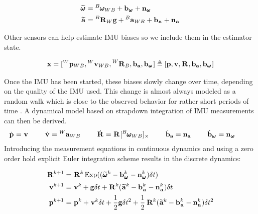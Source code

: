 \begin{equation}
    \begin{split}
    \prescript{}{}{\widetilde{\pmb{\omega}}}_{} &= \prescript{B}{}{\pmb{\omega}}_{WB} + {\bf b}_{\prescript{}{}{\pmb{\omega}}_{}} + {\bf n}_{\prescript{}{}{\pmb{\omega}}_{}} 
    \\
    \prescript{}{}{\widetilde{{\bf a}}}_{}    &= \prescript{B}{}{{\bf R}}_{W} {\bf g} + \prescript{B}{}{{\bf a}}_{WB} + {\bf b}_{\prescript{}{}{{\bf a}}_{}} + {\bf n}_{\prescript{}{}{{\bf a}}_{}} 
    \end{split}
    \label{eq:imu_meas_model}
\end{equation}
    
Other sensors can help estimate IMU biases so we include them in the estimator state.

\begin{equation}
    {\bf x} = [\prescript{W}{}{{\bf p}}_{WB}, \prescript{W}{}{{\bf v}}_{WB}, \prescript{W}{}{{\bf R}}_{B}, {\bf b}_{{\bf a}}, {\bf b}_{\prescript{}{}{\pmb{\omega}}_{}}]
    \triangleq 
    [{\bf p}, {\bf v}, \prescript{}{}{{\bf R}}_{}, {\bf b}_{{\bf a}}, {\bf b}_{\prescript{}{}{\pmb{\omega}}_{}}] 
\end{equation}

Once the IMU has been started, these biases slowly change over time, depending on the quality of the IMU used. This change is almost always modeled 
as a random walk which is close to the observed behavior for rather short periods of time \cite{hussen2015low}.
A dynamical model based on strapdown integration of IMU measurements can then be derived.
%
\begin{equation}
    \begin{split}
    \dot{\prescript{}{}{{\bf p}}_{}} = \prescript{}{}{{\bf v}}_{}  ~~~~~~~
    \dot{\prescript{}{}{{\bf v}}_{}} = \prescript{W}{}{{\bf a}}_{WB} ~~~~~~~
    \dot{\prescript{}{}{{\bf R}}_{}} = \prescript{}{}{{\bf R}}_{} [\prescript{B}{}{\pmb{\omega}}_{WB}]_{\times} ~~~~~~~
    \dot{{\bf b}}_{{\bf a}} = {\bf n}_{{\bf a}}  ~~~~~~~
    \dot{{\bf b}}_{\prescript{}{}{\pmb{\omega}}_{}} = {\bf n}_{\prescript{}{}{\pmb{\omega}}_{}} ~~~~~~~
    \end{split}
    \label{eq:imu_dyn_conti}
\end{equation}
%
Introducing the measurement equations  in continuous dynamics  and using a zero order hold
explicit Euler integration scheme results in the discrete dynamics:

\begin{equation}
    \begin{split}
    \prescript{}{}{{\bf R}}_{}^{k+1}  &= \prescript{}{}{{\bf R}}_{}^{k}\operatorname*{Exp}((\prescript{}{}{\widetilde{\pmb{\omega}}}_{}^k - {\bf b}_{\prescript{}{}{\pmb{\omega}}_{}}^k - {\bf n}_{\prescript{}{}{\pmb{\omega}}_{}}^k)\delta t)
    \\
    \prescript{}{}{{\bf v}}_{}^{k+1}  &= \prescript{}{}{{\bf v}}_{}^{k} + {\bf g} \delta t + \prescript{}{}{{\bf R}}_{}^{k}(\prescript{}{}{\widetilde{{\bf a}}}_{}^k - {\bf b}_{\prescript{}{}{{\bf a}}_{}}^k - {\bf n}_{\prescript{}{}{{\bf a}}_{}}^k)\delta t
    \\
    \prescript{}{}{{\bf p}}_{}^{k+1} &= \prescript{}{}{{\bf p}}_{}^{k} + \prescript{}{}{{\bf v}}_{}^{k}\delta t + \frac{1}{2}{\bf g} \delta t^2 
    + \frac{1}{2}\prescript{}{}{{\bf R}}_{}^{k}(\prescript{}{}{\widetilde{{\bf a}}}_{}^k - {\bf b}_{\prescript{}{}{{\bf a}}_{}}^k - {\bf n}_{\prescript{}{}{{\bf a}}_{}}^k)\delta t^2
    \end{split}
    \label{eq:imu_dyn_disc}
\end{equation}
    
